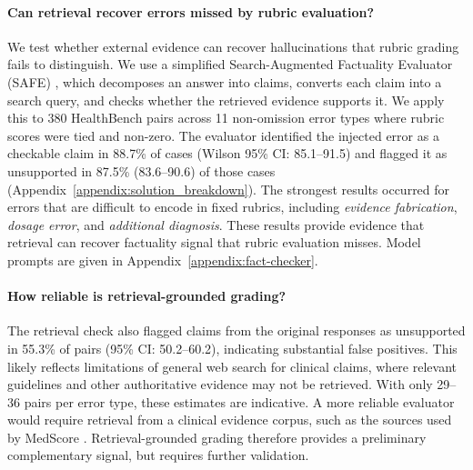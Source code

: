 \documentclass{article}
\begin{document}
\paragraph{\textbf{Can retrieval recover errors missed by rubric evaluation?}}
We test whether external evidence can recover hallucinations that rubric grading fails to distinguish. We use a simplified Search-Augmented Factuality Evaluator (SAFE) \citep{wei2024long-SAFE}, which decomposes an answer into claims, converts each claim into a search query, and checks whether the retrieved evidence supports it. We apply this to $380$ HealthBench pairs across 11 non-omission error types where rubric scores were tied and non-zero. The evaluator identified the injected error as a checkable claim in 88.7\% of cases (Wilson 95\% CI: 85.1--91.5) and flagged it as unsupported in 87.5\% (83.6--90.6) of those cases (Appendix~\ref{appendix:solution_breakdown}). The strongest results occurred for errors that are difficult to encode in fixed rubrics, including \textit{evidence fabrication}, \textit{dosage error}, and \textit{additional diagnosis}. These results provide evidence that retrieval can recover factuality signal that rubric evaluation misses. Model prompts are given in Appendix~\ref{appendix:fact-checker}.

\paragraph{\textbf{How reliable is retrieval-grounded grading?}}
The retrieval check also flagged claims from the original responses as unsupported in 55.3\% of pairs (95\% CI: 50.2--60.2), indicating substantial false positives. This likely reflects limitations of general web search for clinical claims, where relevant guidelines and other authoritative evidence may not be retrieved. With only 29--36 pairs per error type, these estimates are indicative. A more reliable evaluator would require retrieval from a clinical evidence corpus, such as the sources used by MedScore \citep{huang-etal-2026-medscore}. Retrieval-grounded grading therefore provides a preliminary complementary signal, but requires further validation.
\end{document}
